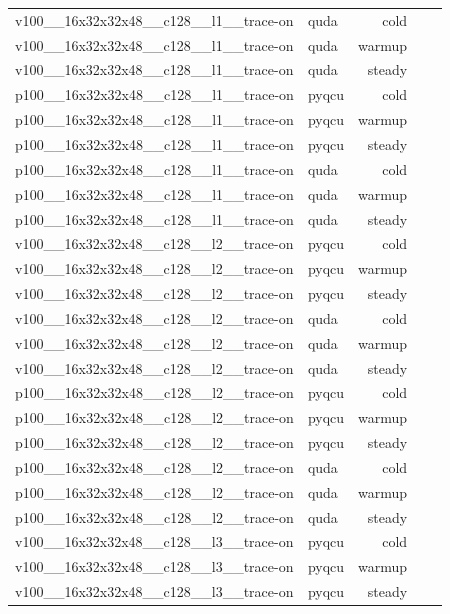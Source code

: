 \begin{table}[htbp]
\begin{tabular}{@{}llrrr@{}}
v100\_\_16x32x32x48\_\_c128\_\_l1\_\_trace-on & quda & cold &  &  \\
v100\_\_16x32x32x48\_\_c128\_\_l1\_\_trace-on & quda & warmup &  &  \\
v100\_\_16x32x32x48\_\_c128\_\_l1\_\_trace-on & quda & steady &  &  \\
p100\_\_16x32x32x48\_\_c128\_\_l1\_\_trace-on & pyqcu & cold &  &  \\
p100\_\_16x32x32x48\_\_c128\_\_l1\_\_trace-on & pyqcu & warmup &  &  \\
p100\_\_16x32x32x48\_\_c128\_\_l1\_\_trace-on & pyqcu & steady &  &  \\
p100\_\_16x32x32x48\_\_c128\_\_l1\_\_trace-on & quda & cold &  &  \\
p100\_\_16x32x32x48\_\_c128\_\_l1\_\_trace-on & quda & warmup &  &  \\
p100\_\_16x32x32x48\_\_c128\_\_l1\_\_trace-on & quda & steady &  &  \\
v100\_\_16x32x32x48\_\_c128\_\_l2\_\_trace-on & pyqcu & cold &  &  \\
v100\_\_16x32x32x48\_\_c128\_\_l2\_\_trace-on & pyqcu & warmup &  &  \\
v100\_\_16x32x32x48\_\_c128\_\_l2\_\_trace-on & pyqcu & steady &  &  \\
v100\_\_16x32x32x48\_\_c128\_\_l2\_\_trace-on & quda & cold &  &  \\
v100\_\_16x32x32x48\_\_c128\_\_l2\_\_trace-on & quda & warmup &  &  \\
v100\_\_16x32x32x48\_\_c128\_\_l2\_\_trace-on & quda & steady &  &  \\
p100\_\_16x32x32x48\_\_c128\_\_l2\_\_trace-on & pyqcu & cold &  &  \\
p100\_\_16x32x32x48\_\_c128\_\_l2\_\_trace-on & pyqcu & warmup &  &  \\
p100\_\_16x32x32x48\_\_c128\_\_l2\_\_trace-on & pyqcu & steady &  &  \\
p100\_\_16x32x32x48\_\_c128\_\_l2\_\_trace-on & quda & cold &  &  \\
p100\_\_16x32x32x48\_\_c128\_\_l2\_\_trace-on & quda & warmup &  &  \\
p100\_\_16x32x32x48\_\_c128\_\_l2\_\_trace-on & quda & steady &  &  \\
v100\_\_16x32x32x48\_\_c128\_\_l3\_\_trace-on & pyqcu & cold &  &  \\
v100\_\_16x32x32x48\_\_c128\_\_l3\_\_trace-on & pyqcu & warmup &  &  \\
v100\_\_16x32x32x48\_\_c128\_\_l3\_\_trace-on & pyqcu & steady &  &  \\

\end{tabular}
\end{table}

